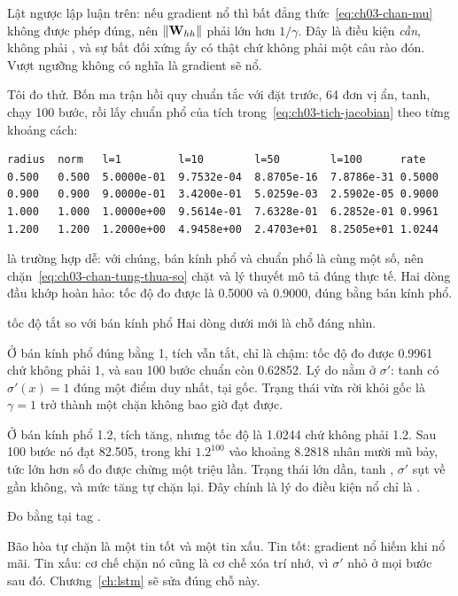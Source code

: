 %
Lật ngược lập luận trên: nếu gradient nổ thì bất đẳng thức~\eqref{eq:ch03-chan-mu}
không được phép đúng, nên \(\lVert \mathbf{W}_{hh} \rVert\) phải lớn hơn \(1/\gamma\).
Đây là điều kiện \emph{cần}, không phải , và sự bất đối xứng ấy có
thật chứ không phải một câu rào đón. Vượt ngưỡng không có nghĩa là gradient sẽ
nổ.

Tôi đo thử. Bốn ma trận hồi quy chuẩn tắc với  đặt trước, 64 đơn vị
ẩn, tanh, chạy 100 bước, rồi lấy chuẩn phổ của tích
trong~\eqref{eq:ch03-tich-jacobian} theo từng khoảng cách:

\begin{verbatim}
radius  norm   l=1         l=10        l=50        l=100      rate
0.500   0.500  5.0000e-01  9.7532e-04  8.8705e-16  7.8786e-31 0.5000
0.900   0.900  9.0000e-01  3.4200e-01  5.0259e-03  2.5902e-05 0.9000
1.000   1.000  1.0000e+00  9.5614e-01  7.6328e-01  6.2852e-01 0.9961
1.200   1.200  1.2000e+00  4.9458e+00  2.4703e+01  8.2505e+01 1.0244
\end{verbatim}

 là trường hợp dễ: với chúng, bán kính phổ
và chuẩn phổ là cùng
một số, nên chặn~\eqref{eq:ch03-chan-tung-thua-so} chặt và lý thuyết mô tả đúng
thực tế. Hai dòng đầu khớp hoàn hảo: tốc độ đo được là 0.5000 và 0.9000, đúng
bằng bán kính phổ.

\begin{measured}{tốc độ tắt so với bán kính phổ}
Hai dòng dưới mới là chỗ đáng nhìn.

Ở bán kính phổ đúng bằng 1, tích vẫn tắt, chỉ là chậm: tốc độ đo được 0.9961
chứ không phải 1, và sau 100 bước chuẩn còn 0.62852. Lý do nằm ở
\(\sigma'\): tanh có \(\sigma'(x) = 1\) đúng một điểm duy nhất, tại gốc. Trạng
thái vừa rời khỏi gốc là \(\gamma = 1\) trở thành một chặn không bao giờ đạt
được.

Ở bán kính phổ 1.2, tích tăng, nhưng tốc độ là 1.0244 chứ không phải 1.2. Sau
100 bước nó đạt 82.505, trong khi \(1.2^{100}\) vào khoảng 8.2818 nhân mười mũ
bảy, tức lớn hơn số đo được chừng một triệu lần. Trạng thái lớn dần, tanh
, \(\sigma'\) sụt về gần không, và
mức tăng tự chặn lại. Đây chính là lý do điều kiện nổ chỉ là .

Đo bằng  tại tag .
\end{measured}

Bão hòa tự chặn là một tin tốt và một tin xấu. Tin tốt: gradient nổ hiếm khi
nổ mãi. Tin xấu: cơ chế chặn nó cũng là cơ chế xóa trí nhớ, vì
\(\sigma'\) nhỏ ở mọi bước sau đó. Chương~\ref{ch:lstm} sẽ sửa đúng chỗ này.
